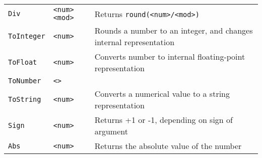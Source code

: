 \begin{longtable}{p{3cm}p{3cm}p{6cm}}
\texttt{Div}     &\verb+<num> <mod>+   &Returns \verb+round(<num>/<mod>)+ \\
\texttt{ToInteger}&\verb+<num>+        &Rounds a number to an integer, and changes internal representation\\
\texttt{ToFloat}  &\verb+<num>+        &Converts number to internal floating-point representation\\
\texttt{ToNumber} &\verb+<>+           &                              \\
\texttt{ToString} &\verb+<num>+        &Converts a numerical value to  a string representation\\
\texttt{Sign}     &\verb+<num>+        &Returns +1 or -1, depending on sign of argument\\
\texttt{Abs}      &\verb+<num>+        &Returns the absolute value of the number\\


\end{longtable}
